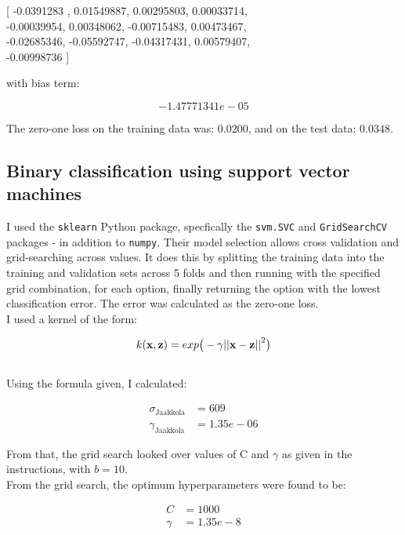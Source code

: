 \documentclass{scrartcl}
\begin{document}
\begin{center}
[  -0.0391283 ,  0.01549887,  0.00295803,  0.00033714, \\
   -0.00039954,  0.00348062, -0.00715483,  0.00473467, \\
   -0.02685346, -0.05592747, -0.04317431,  0.00579407, \\
  -0.00998736
]
\end{center}

with bias term:

\[ -1.47771341e-05 \]

The zero-one loss on the training data was: $0.0200$, and on the test data: $0.0348$.

\subsection{Binary classification using support vector machines}
I used the \texttt{sklearn} Python package, specfically the \texttt{svm.SVC} and \texttt{GridSearchCV} packages - in addition to \texttt{numpy}. Their model selection allows cross validation and grid-searching across values. It does this by splitting the training data into the training and validation sets across 5 folds and then running with the specified grid combination, for each option, finally returning the option with the lowest classification error. The error was calculated as the zero-one loss.\\

I used a kernel of the form:

\[ k({\mathbf x}, {\mathbf z}) = exp \big(-\gamma {|| {\mathbf x}- {\mathbf z}||}^2\big) \] \\

\newpage
Using the formula given, I calculated:

\begin{align*}
    \sigma_{\text{Jaakkola}} &= 609 \\
    \gamma_{\text{Jaakkola}} &= 1.35e-06
\end{align*}

From that, the grid search looked over values of C and $\gamma$ as given in the instructions, with $b = 10$. \\

From the grid search, the optimum hyperparameters were found to be:

\begin{align*}
    C &= 1000 \\
    \gamma &= 1.35e-8
\end{align*}
\end{document}
